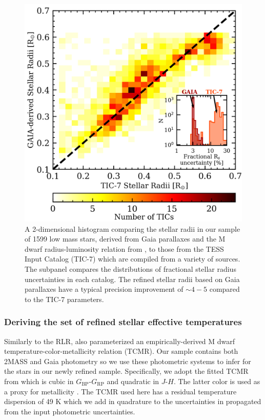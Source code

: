 \begin{figure}
  \centering
  \includegraphics[width=0.6\hsize]{figures/stellarradii.png}
  \caption[Comparison of stellar radii derived from Gaia parallaxes to values in the TIC-7.]
      {A 2-dimensional histogram comparing the stellar radii in our sample of 1599 low mass stars,
    derived from Gaia parallaxes and the M dwarf radius-luminosity relation from \cite{mann15}, to those
    from the TESS Input Catalog (TIC-7) which are compiled from a variety of sources. The subpanel compares the
    distributions of fractional stellar radius uncertainties in each catalog. The refined stellar radii 
    based on Gaia parallaxes have a typical precision improvement of $\sim 4-5$ compared to the TIC-7
    parameters.}
  \label{fig:Rs}
\end{figure}

\subsubsection{Deriving the set of refined stellar effective temperatures}
Similarly to the RLR, \citep{mann15} also parameterized an empirically-derived M dwarf temperature-color-metallicity
relation (TCMR). Our sample contains both 2MASS and Gaia photometry so we use these photometric systems to infer
\teff{} for the stars in our newly refined sample. Specifically, we adopt the fitted TCMR from \cite{mann15} which is
cubic in $G_{\text{BP}}$-$G_{\text{RP}}$ and quadratic in $J$-$H$. The latter color is used as a proxy for metallicity
\citep{leggett92,johnson12,mann13,newton14}. The TCMR used here has a residual temperature dispersion of 49 K which we
add in quadrature to the uncertainties in \teff{} propagated from the input photometric uncertainties. 

